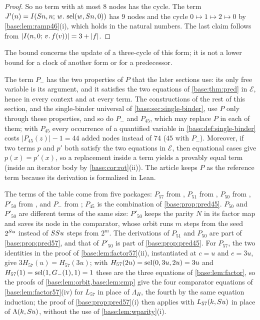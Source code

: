 \begin{proof}
So no term with at most $8$ nodes has the cycle.  The term
$J'(n)=I(S n,n;\,w.\,\operatorname{sel}(w,S n,0))$ has $9$ nodes and the cycle
$0\mapsto 1\mapsto 2\mapsto 0$ by \cref{base:lem:ramp46}(i), which holds in
the natural numbers.  The last claim follows from
$|I(n,0;\,v.\,f(v))|=3+|f|$.
\end{proof}

The bound concerns the update of a three-cycle of this form; it is not a
lower bound for a clock of another form or for a predecessor.

\begin{remark}
\label{base:rem:pred57}
The term $P_-$ has the two properties of $P$ that the later sections use:
its only free variable is its argument, and it satisfies the two equations
of \cref{base:thm:pred} in $\mathcal E$, hence in every context and at every
term.  The constructions of the rest of this section, and the single-binder
universal of \cref{base:sec:single-binder}, use $P$ only through these
properties, and so do $P_-$ and $P_{45}$, which may replace $P$ in each of
them; with $P_{45}$ every occurrence of a quantified variable in
\cref{base:def:single-binder} costs $|P_{45}(z)|-1=44$ added nodes instead of
$74$ ($45$ with $P_-$).  Moreover, if two terms $p$ and
$p'$ both satisfy the two equations in $\mathcal E$, then equational cases
give $p(x)=p'(x)$, so a replacement inside a term yields a provably equal
term (inside an iterator body by \cref{base:cor:rot}(ii)).  The article keeps
$P$ as the reference term because its derivation is formalized in Lean.

The terms of the table come from five packages: $P_{57}$ from
, $P_{51}$ from , $P_{50}$ from
, $P'_{50}$ from , and $P_-$ from
; $P_{45}$ is the combination of
\cref{base:prop:pred45}.  $P_{50}$ and $P'_{50}$ are different terms of the
same size: $P'_{50}$ keeps the parity $N$ in its factor map and saves its
node in the comparator, whose orbit runs $m$ steps from the seed
$2^{S u}$ instead of $SS u$ steps from $2^m$.  The derivations of
$P_{51}$ and $P_{50}$ are part of \cref{base:prop:pred57}, and that of
$P'_{50}$ is part of \cref{base:prop:pred45}.  For $P_{57}$, the
two identities in the proof of \cref{base:lem:factor57}(ii), instantiated at
$c=u$ and $e=3u$, give $3H_{57}(u)=H_{57}(3u)$; with
$H_{57}(2u)=\operatorname{sel}(0,3u,2u)=3u$ and $H_{57}(1)=\operatorname{sel}(1,G_-(1),1)=1$ these are the
three equations of \cref{base:lem:factor}, so the proofs of
\cref{base:lem:orbit,base:lem:cmp} give the four comparator equations of
\cref{base:lem:factor57}(iv) for $L_{57}$ in place of $\Lambda_H$, the fourth
by the same equation induction; the proof of \cref{base:prop:pred57}(i) then
applies with $L_{57}(k,S u)$ in place of $\Lambda(k,S u)$, without the
use of \cref{base:lem:wparity}(i).


\end{remark}
